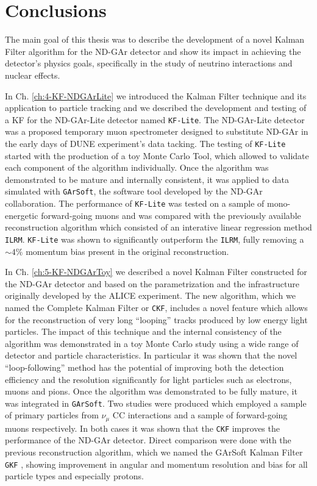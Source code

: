 \begin{savequote}[8cm]
\end{savequote}

\chapter*{\label{ch:10-End}Conclusions}

The main goal of this thesis was to describe the development of a novel Kalman Filter algorithm for the ND-GAr detector and show its impact in achieving the detector's physics goals, specifically in the study of neutrino interactions and nuclear effects. 

In Ch. \ref{ch:4-KF-NDGArLite} we introduced the Kalman Filter technique and its application to particle tracking and we described the development and testing of a KF for the ND-GAr-Lite detector named \texttt{KF-Lite}. The ND-GAr-Lite detector was a proposed temporary muon spectrometer designed to substitute ND-GAr in the early days of DUNE experiment's data tacking. The testing of \texttt{KF-Lite} started with the production of a toy Monte Carlo Tool, which allowed to validate each component of the algorithm individually. Once the algorithm was demonstrated to be mature and internally consistent, it was applied to data simulated with \texttt{GArSoft}, the software tool developed by the ND-GAr collaboration. The performance of \texttt{KF-Lite} was tested on a sample of mono-energetic forward-going muons and was compared with the previously available reconstruction algorithm which consisted of an interative linear regression method \texttt{ILRM}. \texttt{KF-Lite} was shown to significantly outperform the \texttt{ILRM}, fully removing a $\sim4\%$ momentum bias present in the original reconstruction.

In Ch. \ref{ch:5-KF-NDGArToy} we described a novel Kalman Filter constructed for the ND-GAr detector and based on the parametrization and the infrastructure originally developed by the ALICE experiment. The new algorithm, which we named the Complete Kalman Filter or \texttt{CKF}, includes a novel feature which allows for the reconstruction of very long \enquote{looping} tracks produced by low energy light particles. The impact of this technique and the internal consistency of the algorithm was demonstrated in a toy Monte Carlo study using a wide range of detector and particle characteristics. In particular it was shown that the novel \enquote{loop-following} method has the potential of improving both the detection efficiency and the resolution significantly for light particles such as electrons, muons and pions. Once the algorithm was demonstrated to be fully mature, it was integrated in \texttt{GArSoft}. Two studies were produced which employed a sample of primary particles from $\nu_\mu$ CC interactions and a sample of forward-going muons respectively. In both cases it was shown that the \texttt{CKF} improves the performance of the ND-GAr detector. Direct comparison were done with the previous reconstruction algorithm, which we named the GArSoft Kalman Filter \texttt{GKF} , showing improvement in angular and momentum resolution and bias for all particle types and especially protons.

